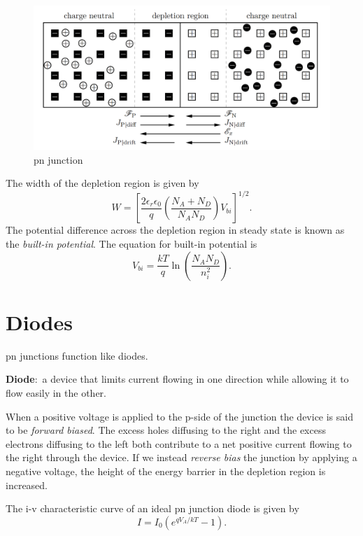 \documentclass[nobib]{tufte-handout}
\newcommand{\defn}[2]{\noindent\textbf{#1}:\ #2}
\begin{document}
\begin{figure}
    \begin{center}
        \caption{pn junction}
        \label{fig:pnjunction}
        \includegraphics{images/pnjunction.png}
    \end{center}
\end{figure}

The width of the depletion region is given by 
\[W = \left[\frac{2\epsilon_r \epsilon_0}{q} \left(\frac{N_A + N_D}{N_A N_D}\right) V_{bi}\right]^{1/2}.\]
The potential difference across the depletion region 
in steady state is known as
the \emph{built-in potential}. 
The equation for built-in potential is 
\[V_{bi} = \frac{kT}{q}\ln{\left(\frac{N_AN_D}{n_i^2}\right)}.\]

\section{Diodes}
pn junctions function like diodes. 

\defn{Diode}{a device that limits current flowing in one
direction while allowing it to flow easily in the other.}

When a positive voltage is applied to the
p-side of the junction the device is said to be \emph{forward biased}.
The excess holes diffusing to the right and the excess electrons diffusing to the
left both contribute to a net positive current flowing to the right through the
device. If we instead \emph{reverse bias} the junction by applying a negative voltage, the height of
the energy barrier in the depletion region is increased. 

The i-v characteristic curve of an ideal pn junction diode is given by
\[I = I_0 (e^{qV_A / kT} - 1).\]
\end{document}
